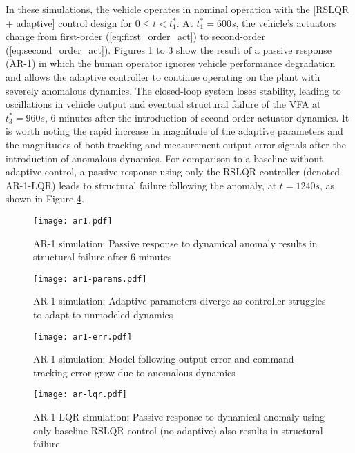 In these simulations, the vehicle operates in nominal operation with the [RSLQR + adaptive] control design for $0 \leq t < t_1^*$. At $t_1^* = 600 s$, the vehicle's actuators change from first-order (\ref{eq:first_order_act}) to second-order (\ref{eq:second_order_act}). Figures \ref{fig:ar1} to \ref{fig:ar1-err} show the result of a passive response (AR-1) in which the human operator ignores vehicle performance degradation and allows the adaptive controller to continue operating on the plant with severely anomalous dynamics. The closed-loop system loses stability, leading to oscillations in vehicle output and eventual structural failure of the VFA at $t_3^* = 960s$, 6 minutes after the introduction of second-order actuator dynamics. It is worth noting the rapid increase in magnitude of the adaptive parameters and the magnitudes of both tracking and measurement output error signals after the introduction of anomalous dynamics. For comparison to a baseline without adaptive control, a passive response using only the RSLQR controller (denoted AR-1-LQR) leads to structural failure following the anomaly, at $t = 1240s$, as shown in Figure \ref{fig:ar-lqr}.

\begin{figure}[htbp]
	\centering
	\texttt{[image: ar1.pdf]}
	\caption{AR-1 simulation: Passive response to dynamical anomaly results in structural failure after 6 minutes}
	\label{fig:ar1}
\end{figure}

\begin{figure}[htbp]
	\centering
	\texttt{[image: ar1-params.pdf]}
	\caption{AR-1 simulation: Adaptive parameters diverge as controller struggles to adapt to unmodeled dynamics}
	\label{fig:ar1-params}
\end{figure}

\begin{figure}[htbp]
	\centering
	\texttt{[image: ar1-err.pdf]}
	\caption{AR-1 simulation: Model-following output error and command tracking error grow due to anomalous dynamics}
	\label{fig:ar1-err}
\end{figure}

\begin{figure}[htbp]
	\centering
	\texttt{[image: ar-lqr.pdf]}
	\caption{AR-1-LQR simulation: Passive response to dynamical anomaly using only baseline RSLQR control (no adaptive) also results in structural failure}
	\label{fig:ar-lqr}
\end{figure}

